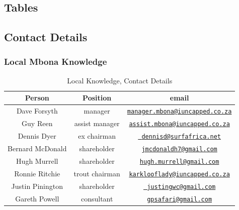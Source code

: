\begin{appendices}

\chapter{Tables}

\section{Contact Details}

\subsection{Local Mbona Knowledge}

\begin{table}[H]
  \centering
  \begin{tabular}{|c|c|c|}
    \hline
       Person & Position & email  \\ \hline
       Dave Forsyth & manager & \href{mailto:manager.mbona@iuncapped.co.za}{\nolinkurl{manager.mbona@iuncapped.co.za}} \\ \hline
       Guy Reen & assist manager & \href{mailto:assist.mbona@iuncapped.co.za}{\nolinkurl{assist.mbona@iuncapped.co.za}} \\ \hline
       Dennis Dyer & ex chairman & \href{mailto: dennisd@surfafrica.net}{\nolinkurl{ dennisd@surfafrica.net}} \\ \hline 
       Bernard McDonald & shareholder & \href{mailto:jmcdonaldh7@gmail.com}{\nolinkurl{jmcdonaldh7@gmail.com}} \\ \hline
       Hugh Murrell & shareholder & \href{mailto:hugh.murrell@gmail.com}{\nolinkurl{hugh.murrell@gmail.com}} \\ \hline
       Ronnie Ritchie & trout chairman & \href{mailto:karklooflady@iuncapped.co.za}{\nolinkurl{karklooflady@iuncapped.co.za}} \\ \hline
       Justin Pinington & shareholder & \href{mailto: justingwc@gmail.com}{\nolinkurl{ justingwc@gmail.com}} \\ \hline      
       Gareth Powell & consultant & \href{mailto:gpsafari@gmail.com}{\nolinkurl{gpsafari@gmail.com}} \\ \hline
     \end{tabular} 
     \caption{Local Knowledge, Contact Details}
  \label{tab:LocalKnowledgeContactDetails}
\end{table}


\end{appendices}
